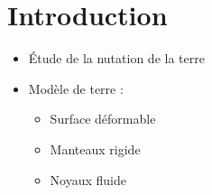 \section{Introduction}

\begin{frame}

  \begin{itemize}
    \item \'Etude de la nutation de la terre 
    \item Modèle de terre :
      \begin{itemize}
        \item Surface déformable
        \item Manteaux rigide
        \item Noyaux fluide
      \end{itemize}
  \end{itemize}

\end{frame}

